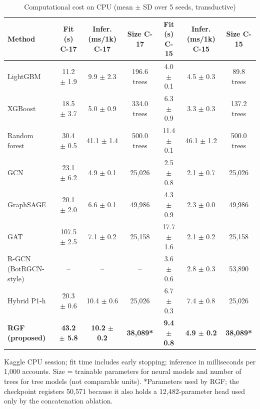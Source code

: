 \begin{table}[!t]
\caption{Computational cost on CPU (mean $\pm$ SD over 5 seeds, transductive)}
\label{tab:computational_cost}
\centering\footnotesize
\setlength{\tabcolsep}{3pt}
\begin{tabular}{lcccccc}
\hline
Method & Fit (s) C-17 & Infer. (ms/1k) C-17 & Size C-17 & Fit (s) C-15 & Infer. (ms/1k) C-15 & Size C-15 \\
\hline
LightGBM & 11.2 $\pm$ 1.9 & 9.9 $\pm$ 2.3 & 196.6 trees & 4.0 $\pm$ 0.1 & 4.5 $\pm$ 0.3 & 89.8 trees \\
XGBoost & 18.5 $\pm$ 3.7 & 5.0 $\pm$ 0.9 & 334.0 trees & 6.3 $\pm$ 0.9 & 3.3 $\pm$ 0.3 & 137.2 trees \\
Random forest & 30.4 $\pm$ 0.5 & 41.1 $\pm$ 1.4 & 500.0 trees & 11.4 $\pm$ 0.1 & 46.1 $\pm$ 1.2 & 500.0 trees \\
GCN & 23.1 $\pm$ 6.2 & 4.9 $\pm$ 0.1 & 25,026 & 2.5 $\pm$ 0.8 & 2.1 $\pm$ 0.7 & 25,026 \\
GraphSAGE & 20.1 $\pm$ 2.0 & 6.6 $\pm$ 0.1 & 49,986 & 4.3 $\pm$ 0.9 & 2.3 $\pm$ 0.0 & 49,986 \\
GAT & 107.5 $\pm$ 2.5 & 7.1 $\pm$ 0.2 & 25,158 & 17.7 $\pm$ 1.6 & 2.1 $\pm$ 0.2 & 25,158 \\
R-GCN (BotRGCN-style) & -- & -- & -- & 3.6 $\pm$ 0.6 & 2.8 $\pm$ 0.3 & 53,890 \\
Hybrid P1-h & 20.3 $\pm$ 0.6 & 10.4 $\pm$ 0.6 & 25,026 & 6.7 $\pm$ 0.3 & 7.4 $\pm$ 0.8 & 25,026 \\
\textbf{RGF (proposed)} & \textbf{43.2 $\pm$ 5.8} & \textbf{10.2 $\pm$ 0.2} & \textbf{38,089*} & \textbf{9.4 $\pm$ 0.8} & \textbf{4.9 $\pm$ 0.2} & \textbf{38,089*} \\
\hline
\end{tabular}
\par\smallskip\parbox{\linewidth}{\scriptsize Kaggle CPU session; fit time includes early stopping; inference in milliseconds per 1,000 accounts. Size = trainable parameters for neural models and number of trees for tree models (not comparable units). *Parameters used by RGF; the checkpoint registers 50,571 because it also holds a 12,482-parameter head used only by the concatenation ablation.}
\end{table}